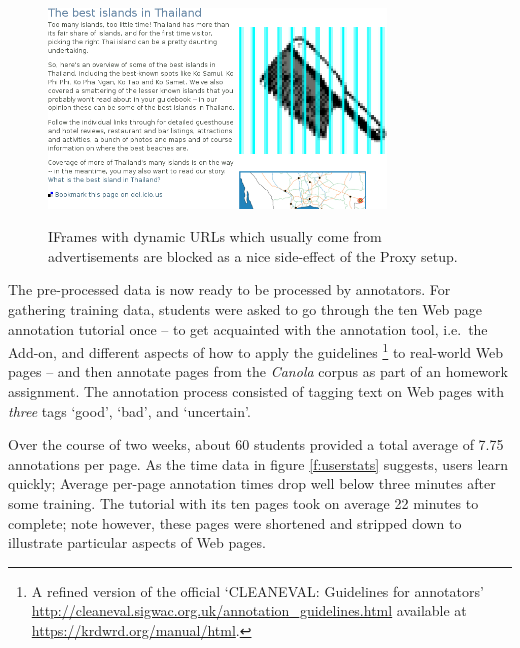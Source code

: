 \begin{figure}
	{\includegraphics[width=0.8\textwidth]{add}}
\caption{\label{f:iframes}IFrames with dynamic URLs which usually come from advertisements are blocked as a nice side-effect of the Proxy setup.}
\end{figure}

The pre-processed data is now ready to be processed by annotators.
For gathering training data, students were asked to go through the ten Web page annotation tutorial once
-- to get acquainted with the annotation tool, i.e.~the Add-on, and different aspects of how to apply the guidelines 
\footnote{A refined version of the official `CLEANEVAL: Guidelines for annotators' \url{http://cleaneval.sigwac.org.uk/annotation_guidelines.html} available at \url{https://krdwrd.org/manual/html}.}
to real-world Web pages -- 
and then annotate pages from the \textit{Canola} corpus as part of an homework assignment.
The annotation process consisted of tagging text on Web pages with \emph{three} tags `good', `bad', and `uncertain'.

Over the course of two weeks, about 60 students provided a total average of 7.75 annotations per page.
As the time data in figure \ref{f:userstats} suggests, users learn quickly; 
Average per-page annotation times drop well below three minutes after some training.
The tutorial with its ten pages took on average 22 minutes to complete;
note however, these pages were shortened and stripped down to illustrate particular aspects of Web pages.

